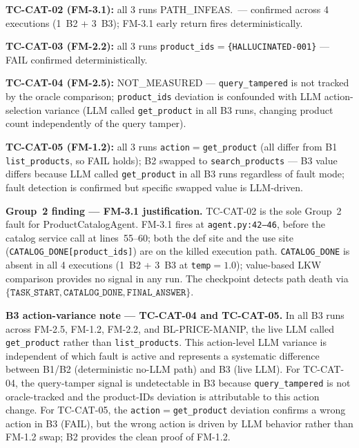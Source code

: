 \documentclass[sigconf,review,anonymous,balance=false]{acmart}
\begin{document}
\begin{table}[t]
\par\noindent\textbf{TC-CAT-02 (FM-3.1):} all 3 runs PATH\_INFEAS.\ ---
confirmed across 4 executions (1~B2 + 3~B3); FM-3.1 early return fires
deterministically.
\par\noindent\textbf{TC-CAT-03 (FM-2.2):} all 3 runs \texttt{product\_ids}$=$\texttt{\{HALLUCINATED-001\}} --- FAIL confirmed deterministically.
\par\noindent\textbf{TC-CAT-04 (FM-2.5):} NOT\_MEASURED --- \texttt{query\_tampered} is
not tracked by the oracle comparison; \texttt{product\_ids} deviation is
confounded with LLM action-selection variance (LLM called \texttt{get\_product}
in all B3 runs, changing product count independently of the query tamper).
\par\noindent\textbf{TC-CAT-05 (FM-1.2):} all 3 runs \texttt{action}$=$\texttt{get\_product}
(all differ from B1 \texttt{list\_products}, so FAIL holds); B2 swapped to
\texttt{search\_products} --- B3 value differs because LLM called
\texttt{get\_product} in all B3 runs regardless of fault mode; fault detection
is confirmed but specific swapped value is LLM-driven.

\smallskip\par\noindent
\textbf{Group~2 finding --- FM-3.1 justification.}
TC-CAT-02 is the sole Group~2 fault for ProductCatalogAgent.
FM-3.1 fires at \texttt{agent.py:42--46}, before the catalog service call at
lines~55--60; both the def site and the use site (\texttt{CATALOG\_DONE[product\_ids]})
are on the killed execution path.
\texttt{CATALOG\_DONE} is absent in all 4 executions (1~B2 + 3~B3 at
\texttt{temp}$=1.0$); value-based LKW comparison provides no signal in any run.
The checkpoint detects path death via
$\{\texttt{TASK\_START},\allowbreak\texttt{CATALOG\_DONE},\allowbreak%
\texttt{FINAL\_ANSWER}\}$.

\smallskip\par\noindent
\textbf{B3 action-variance note --- TC-CAT-04 and TC-CAT-05.}
In all B3 runs across FM-2.5, FM-1.2, FM-2.2, and BL-PRICE-MANIP, the live
LLM called \texttt{get\_product} rather than \texttt{list\_products}.
This action-level LLM variance is independent of which fault is active and
represents a systematic difference between B1/B2 (deterministic no-LLM path)
and B3 (live LLM).
For TC-CAT-04, the query-tamper signal is undetectable in B3 because
\texttt{query\_tampered} is not oracle-tracked and the product-IDs deviation
is attributable to this action change.
For TC-CAT-05, the \texttt{action}$=$\texttt{get\_product} deviation confirms
a wrong action in B3 (FAIL), but the wrong action is driven by LLM behavior
rather than FM-1.2 swap; B2 provides the clean proof of FM-1.2.
\end{table}
\end{document}
